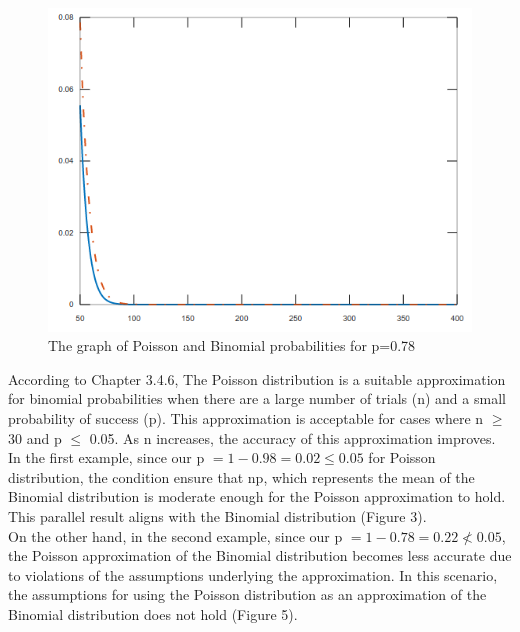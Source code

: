 \documentclass[12pt]{article}
\begin{document}
\begin{figure}[H]
    \centering
    \includegraphics[scale=0.5]{3c_graph}
    \caption{The graph of Poisson and Binomial probabilities for p=0.78}
\end{figure}

According to Chapter 3.4.6, The Poisson distribution is a suitable approximation for binomial probabilities when there are a large number of trials (n) and a small probability of success (p). This approximation is acceptable for cases where n $\geq$ 30 and p $\leq$ 0.05. As n increases, the accuracy of this approximation improves.\\

In the first example, since our p  $ = 1-0.98 = 0.02 \leq 0.05 $ for Poisson distribution, the condition ensure that np, which represents the mean of the Binomial distribution is moderate enough for the Poisson approximation to hold. This parallel result aligns with the Binomial distribution (Figure 3).\\

On the other hand, in the second example, since our p  $ = 1-0.78 = 0.22  \nless 0.05 $, the Poisson approximation of the Binomial distribution becomes less accurate due to violations of the assumptions underlying the approximation. In this scenario, the assumptions for using the Poisson distribution as an approximation of the Binomial distribution does not hold (Figure 5).\\
\end{document}
